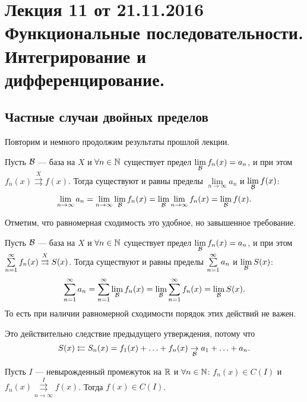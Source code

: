 \documentclass[a4paper, 12pt]{article}
\begin{document}
\newcommand{\tto}{\rightrightarrows}
\newcommand{\dx}{\mathrm{d}x}
\renewcommand{\d}{\mathrm{d}}
\pagestyle{fancy}

\section{Лекция 11 от 21.11.2016 \\ Функциональные последовательности. Интегрирование и дифференцирование.}

\subsection{Частные случаи двойных пределов}

Повторим и немного продолжим результаты прошлой лекции.

\begin{Statement}
	Пусть $\mathcal{B}$ --- база на $X$ и $\forall n \in \mathbb{N}$ существует предел $\lim\limits_{\mathcal{B}} f_n(x) = a_n$, и при этом $f_n(x) \overset{X}{\tto} f(x)$. Тогда существуют и равны пределы $\lim\limits_{n \to \infty} a_n$ и $\lim\limits_{\mathcal{B}}f(x)$:
	$$
	\lim\limits_{n \to \infty} a_n = \lim\limits_{n \to \infty}\lim\limits_{\mathcal{B}}f_n(x) = \lim\limits_{\mathcal{B}}\lim\limits_{n \to \infty} f_n(x) = \lim\limits_{\mathcal{B}}f(x).
	$$
\end{Statement}

Отметим, что равномерная сходимость это удобное, но завышенное требование.

\begin{Consequence}
	Пусть $\mathcal{B}$ --- база на $X$ и $\forall n \in \mathbb{N}$ существует предел $\lim\limits_{\mathcal{B}}f_n(x) = a_n$, и при этом $\sseries f_n(x) \overset{X}{\tto} S(x)$. Тогда существуют и равны пределы $\sum\limits_{n=1}^{\infty} a_n$ и $\lim\limits_{\mathcal{B}} S(x)$:
	$$
	\sum\limits_{n=1}^{\infty} a_n =  \sum\limits_{n=1}^{\infty} \lim\limits_{\mathcal{B}}f_n(x) = \lim\limits_{\mathcal{B}}\sum\limits_{n=1}^{\infty} f_n(x) =	\lim\limits_{\mathcal{B}} S(x).
	$$
	То есть при наличии равномерной сходимости порядок этих действий не важен.
\end{Consequence}

Это действительно следствие предыдущего утверждения, потому что
$$
S(x) \leftleftarrows S_n(x) = f_1(x) + \ldots + f_n(x) \underset{\mathcal{B}}{\rightarrow} a_1 + \ldots + a_n.
$$

\begin{Consequence}
	Пусть $I$ --- невырожденный промежуток на $\mathbb{R}$ и $\forall n \in \mathbb{N}$: $f_n(x) \in C(I)$ и $f_n(x) \overset{I}{\underset{n \to \infty}{\tto}} f(x)$. Тогда $f(x) \in C(I)$. 
\end{Consequence}
\end{document}
